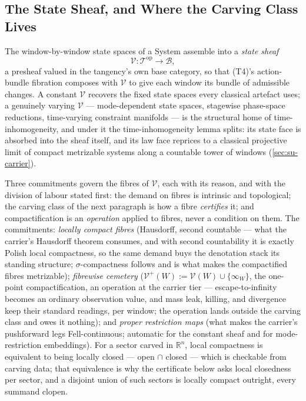 \subsection{The State Sheaf, and Where the Carving Class Lives}

The window-by-window state spaces of a System assemble into a
\emph{state sheaf}
\[
  \mathcal{V} \colon \mathcal{T}^{\mathrm{op}} \longrightarrow
  \mathcal{B},
\]
a presheaf valued in the tangency's own base category, so that (T4)'s
action-bundle fibration composes with $\mathcal{V}$ to give each
window its bundle of admissible changes. A constant $\mathcal{V}$
recovers the fixed state spaces every classical artefact uses; a
genuinely varying $\mathcal{V}$ --- mode-dependent state spaces,
stagewise phase-space reductions, time-varying constraint manifolds ---
is the structural home of time-inhomogeneity, and under it the
time-inhomogeneity lemma splits: its state face is
absorbed into the sheaf itself, and its law face reprices to a
classical projective limit of compact metrizable systems along a
countable tower of windows (\autoref{sec:su-carrier}).

Three commitments govern the fibres of $\mathcal{V}$, each with its
reason, and with the division of labour stated first: the demand on
fibres is intrinsic and topological; the carving class of the next
paragraph is how a fibre \emph{certifies} it; and compactification
is an \emph{operation} applied to fibres, never a condition on them.
The commitments: \emph{locally compact fibres} (Hausdorff, second
countable --- what the carrier's Hausdorff theorem consumes, and
with second countability it is exactly Polish local compactness, so
the same demand buys the denotation stack its standing structure;
$\sigma$-compactness follows and is what makes the compactified
fibres metrizable); \emph{fibrewise cemetery} ($\mathcal{V}^{+}(W)
:= \mathcal{V}(W) \cup \{\infty_W\}$, the one-point
compactification, an operation at the carrier tier ---
escape-to-infinity becomes an ordinary observation value, and mass
leak, killing, and divergence keep their standard readings, per
window; the operation lands outside the carving class and owes it
nothing); and \emph{proper restriction maps} (what makes the
carrier's pushforward legs Fell-continuous; automatic for the
constant sheaf and for mode-restriction embeddings). For a sector
carved in $\mathbb{R}^n$, local compactness is equivalent to being
locally closed --- open $\cap$ closed --- which is checkable from
carving data; that equivalence is why the certificate below asks
local closedness per sector, and a disjoint union of such sectors
is locally compact outright, every summand clopen.


